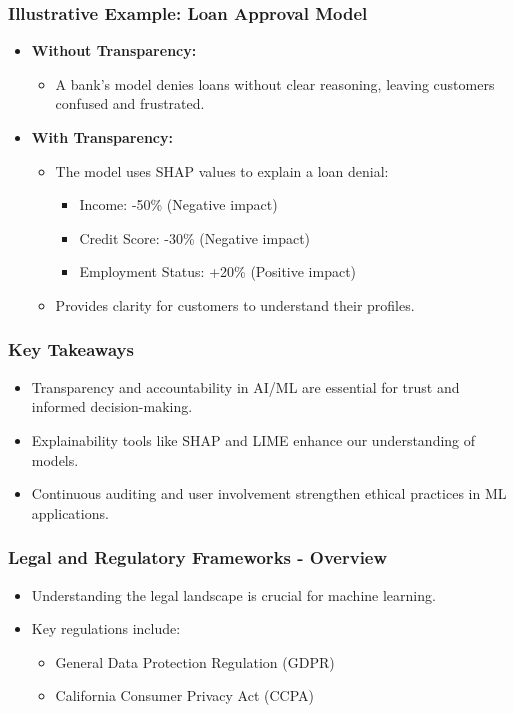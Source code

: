 \documentclass[aspectratio=169]{beamer}
\begin{document}
\begin{frame}[fragile]
    \frametitle{Illustrative Example: Loan Approval Model}
    \begin{itemize}
        \item \textbf{Without Transparency:} 
        \begin{itemize}
            \item A bank's model denies loans without clear reasoning, leaving customers confused and frustrated.
        \end{itemize}
        
        \item \textbf{With Transparency:}
        \begin{itemize}
            \item The model uses SHAP values to explain a loan denial:
            \begin{itemize}
                \item Income: -50\% (Negative impact)
                \item Credit Score: -30\% (Negative impact)
                \item Employment Status: +20\% (Positive impact)
            \end{itemize}
            \item Provides clarity for customers to understand their profiles.
        \end{itemize}
    \end{itemize}
\end{frame}

\begin{frame}[fragile]
    \frametitle{Key Takeaways}
    \begin{itemize}
        \item Transparency and accountability in AI/ML are essential for trust and informed decision-making.
        \item Explainability tools like SHAP and LIME enhance our understanding of models.
        \item Continuous auditing and user involvement strengthen ethical practices in ML applications.
    \end{itemize}
\end{frame}

\begin{frame}[fragile]
    \frametitle{Legal and Regulatory Frameworks - Overview}
    \begin{itemize}
        \item Understanding the legal landscape is crucial for machine learning.
        \item Key regulations include:
        \begin{itemize}
            \item General Data Protection Regulation (GDPR)
            \item California Consumer Privacy Act (CCPA)
        \end{itemize}
    \end{itemize}
\end{frame}
\end{document}
